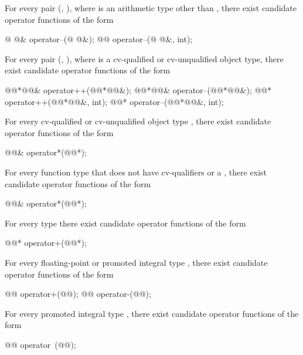 \pnum
For every pair
(,
),
where
is an arithmetic type other than
,
there exist candidate operator functions of the form
\begin{codeblock}
@ @& operator--(@ @&);
@@ operator--(@ @&, int);
\end{codeblock}

\pnum
For every pair
(,
),
where
is a cv-qualified or cv-unqualified object type,
there exist candidate operator functions of the form
\begin{codeblock}
@@*@@& operator++(@@*@@&);
@@*@@& operator--(@@*@@&);
@@*    operator++(@@*@@&, int);
@@*    operator--(@@*@@&, int);
\end{codeblock}

\pnum
For every cv-qualified or cv-unqualified object type
,
there exist candidate operator functions of the form
\begin{codeblock}
@@&    operator*(@@*);
\end{codeblock}

\pnum
For every function type
 that does not have cv-qualifiers or a ,
there exist candidate operator functions of the form
\begin{codeblock}
@@&    operator*(@@*);
\end{codeblock}

\pnum
For every type  there exist candidate operator functions of the form
\begin{codeblock}
@@*    operator+(@@*);
\end{codeblock}

\pnum
For every floating-point or promoted integral type ,
there exist candidate operator functions of the form
\begin{codeblock}
@@ operator+(@@);
@@ operator-(@@);
\end{codeblock}

\pnum
For every promoted integral type
,
there exist candidate operator functions of the form
\begin{codeblock}
@@ operator~(@@);
\end{codeblock}

